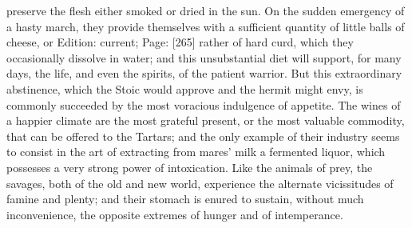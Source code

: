 preserve the flesh either smoked or dried in the sun. On the sudden emergency of a hasty march, they provide themselves with a sufficient quantity of little balls of cheese, or Edition: current; Page: [265] rather of hard curd, which they occasionally dissolve in water; and this unsubstantial diet will support, for many days, the life, and even the spirits, of the patient warrior. But this extraordinary abstinence, which the Stoic would approve and the hermit might envy, is commonly succeeded by the most voracious indulgence of appetite. The wines of a happier climate are the most grateful present, or the most valuable commodity, that can be offered to the Tartars; and the only example of their industry seems to consist in the art of extracting from mares\texthebrew{}’ milk a fermented liquor, which possesses a very strong power of intoxication. Like the animals of prey, the savages, both of the old and new world, experience the alternate vicissitudes of famine and plenty; and their stomach is enured to sustain, without much inconvenience, the opposite extremes of hunger and of intemperance.


